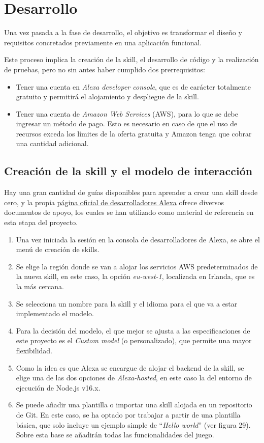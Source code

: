 \section{Desarrollo}

Una vez pasada a la fase de desarrollo, el objetivo es transformar el diseño y requisitos concretados previamente en una aplicación funcional. 

Este proceso implica la creación de la skill, el desarrollo de código y la realización de pruebas, pero no sin antes haber cumplido dos prerrequisitos:
\begin{itemize}
	\item Tener una cuenta en \textit{Alexa developer console}, que es de carácter totalmente gratuito y permitirá el alojamiento y despliegue de la skill. 
	\item Tener una cuenta de \textit{Amazon Web Services} (AWS), para lo que se debe ingresar un método de pago. Esto es necesario en caso de que el uso de recursos exceda los límites de la oferta gratuita y Amazon tenga que cobrar una cantidad adicional.
\end{itemize}

\subsection{Creación de la skill y el modelo de interacción}

Hay una gran cantidad de guías disponibles para aprender a crear una skill desde cero, y la propia \href{https://developer.amazon.com/en-US/docs/alexa/hosted-skills/build-a-skill-end-to-end-using-an-alexa-hosted-skill.html}{página oficial de desarrolladores Alexa} ofrece diversos documentos de apoyo, los cuales se han utilizado como material de referencia en esta etapa del proyecto.

\begin{enumerate}
	\item Una vez iniciada la sesión en la consola de desarrolladores de Alexa, se abre el menú de creación de skills.
	\item Se elige la región donde se van a alojar los servicios AWS predeterminados de la nueva skill, en este caso, la opción \textit{eu-west-1}, localizada en Irlanda, que es la más cercana.
	\item Se selecciona un nombre para la skill y el idioma para el que va a estar implementado el modelo.
	\item Para la decisión del modelo, el que mejor se ajusta a las especificaciones de este proyecto es el \textit{Custom model} (o personalizado), que permite una mayor flexibilidad.
	\item Como la idea es que Alexa se encargue de alojar el backend de la skill, se elige una de las dos opciones de \textit{Alexa-hosted}, en este caso la del entorno de ejecución de Node.js v16.x.
	\item Se puede añadir una plantilla o importar una skill alojada en un repositorio de Git. En este caso, se ha optado por trabajar a partir de una plantilla básica, que solo incluye un ejemplo simple de \enquote{\textit{Hello world}} (ver figura 29). Sobre esta base se añadirán todas las funcionalidades del juego.
\end{enumerate}

